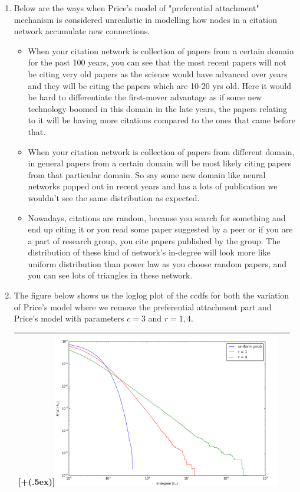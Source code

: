 \documentclass{article}
\newcommand*{\addheight}[2][.5ex]{%
  \raisebox{0pt}[\dimexpr\height+(#1)\relax]{#2}%
}
\begin{document}
\begin{enumerate}[label=(\alph*)]
\item
Below are the ways when Price's model of "preferential attachment" mechanism is considered unrealistic in modelling how nodes in a citation network accumulate new connections.
\begin{itemize}
\item
When your citation network is collection of papers from a certain domain for the past 100 years, you can see that the most recent papers will not be citing very old papers as the science would have advanced over years and they will be citing the papers which are 10-20 yrs old. Here it would be hard to differentiate the first-mover advantage as if some new technology boomed in this domain in the late years, the papers relating to it will be having more citations compared to the ones that came before that.
\item
When your citation network is collection of papers from different domain, in general papers from a certain domain will be most likely citing papers from that particular domain. So say some new domain like neural networks popped out in recent years and has a lots of publication we wouldn't see the same distribution as expected.  
\item
Nowadays, citations are random, because you search for something and end up citing it or you read some paper suggested by a peer or if you are a part of research group, you cite papers published by the group. The distribution of these kind of network's in-degree will look more like uniform distribution than power law as you choose random papers, and you can see lots of triangles in these network.
\end{itemize}

\item
The figure below shows us the loglog plot of the ccdfs for both the variation of Price's model where we remove the preferential attachment part and Price's model with parameters $c=3$ and $r={1,4}$.
\begin{table}[H]
\centering
\begin{tabular}{|c|c|}
	\hline
	\addheight{\includegraphics[width=100mm]{images/1e.png}} \\
	\hline
\end{tabular}
\end{table}
\end{enumerate}
\end{document}
